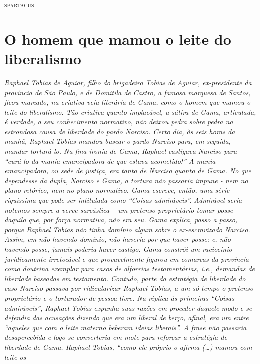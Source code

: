 {\begin{flushright}
\textsc{spartacus}
\end{flushright}

\part{O homem que mamou o leite do liberalismo}

\begin{argumento}
\emph{Raphael Tobias de Aguiar, filho do brigadeiro Tobias de Aguiar,
ex-presidente da província de São Paulo, e de Domitila de Castro, a
famosa marquesa de Santos, ficou marcado, na criativa veia literária de
Gama, como o homem que mamou o leite do liberalismo. Tão criativa quanto
implacável, a sátira de Gama, articulada, é verdade, a seu conhecimento
normativo, não deixou pedra sobre pedra na estrondosa causa de liberdade
do pardo Narciso. Certo dia, às seis horas da manhã, Raphael Tobias
mandou buscar o pardo Narciso para, em seguida, mandar torturá-lo. Na
fina ironia de Gama, Raphael castigava Narciso para ``curá-lo da mania
emancipadora de que estava acometido!'' A mania emancipadora, ou sede de
justiça, era tanto de Narciso quanto de Gama. No que dependesse da
dupla, Narciso e Gama, a tortura não passaria impune - nem no plano
retórico, nem no plano normativo. Gama escreve, então, uma série
riquíssima que pode ser intitulada como ``Coisas admiráveis''. Admirável
seria -- notemos sempre a verve sarcástica -- um pretenso proprietário
tomar posse daquilo que, por força normativa, não era seu. Gama explica,
passo a passo, porque Raphael Tobias não tinha domínio algum sobre o
ex-escravizado Narciso. Assim, em não havendo domínio, não haveria por
que haver posse; e, não havendo posse, jamais poderia haver castigo.
Gama constrói um raciocínio juridicamente irretocável e que
provavelmente figurou em comarcas da província como doutrina exemplar
para casos de alforrias testamentárias, i.e., demandas de liberdade
baseadas em testamento. Contudo, parte da estratégia de liberdade do
caso Narciso passava por ridicularizar Raphael Tobias, a um só tempo o
pretenso proprietário e o torturador de pessoa livre. Na réplica às
primeiras ``Coisas admiráveis'', Raphael Tobias expunha suas razões em
proceder daquele modo e se defendia das acusações dizendo que era um
liberal de berço, afinal, era um entre ``aqueles que com o leite materno
beberam ideias liberais''. A frase não passaria desapercebida e logo se
converteria em mote para reforçar a estratégia de liberdade de Gama.
Raphael Tobias, ``como ele próprio o afirma (\ldots{}) mamou com leite os
}
\end{argumento}}
